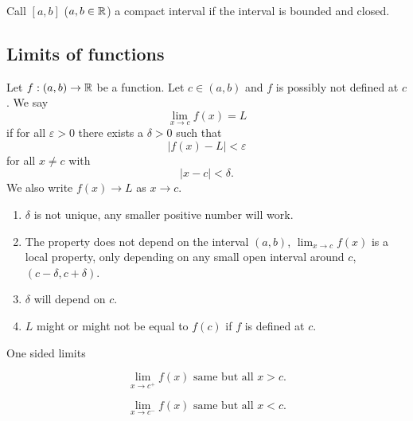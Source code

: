\documentclass[10pt, a4paper]{article}
\begin{document}
\begin{definition}
    Call $[a, b]$
    ($a, b \in \mathbb{R}$)
    a compact interval if the interval is bounded and closed.
\end{definition}

\subsection{Limits of functions}

\begin{definition}
    Let $f : (a, b) \to \mathbb{R}$ be a function.
    Let $c \in (a, b)$ and $f$ is possibly not defined at $c$.
    We say
    \[
    \lim_{x \to c}f(x) = L
    \]
    if for all $\varepsilon > 0$ there exists a $\delta > 0$ such that
    \[
    |f(x) - L| < \varepsilon
    \]
    for all $x \neq c$ with
    \[
    |x - c| < \delta.
    \]
    We also write $f(x) \to L$ as $x \to c$.
\end{definition}

\begin{remark}
    \begin{enumerate}[label = (\roman*)]
        \item $\delta$ is not unique,
        any smaller positive number will work.

        \item The property does not depend on the interval $(a, b)$,
        $\lim_{x \to c}f(x)$ is a local property,
        only depending on any small open interval around $c$,
        $(c - \delta, c + \delta)$.

        \item $\delta$ will depend on $c$.

        \item $L$ might or might not be equal to $f(c)$ if $f$ is defined at $c$.
    \end{enumerate}
\end{remark}

One sided limits

\begin{definition}
    \[
    \lim_{x \to c ^ {+}}f(x) \text{ same but all } x > c.
    \]
\end{definition}


\begin{definition}
    \[
    \lim_{x \to c ^ {-}}f(x) \text{ same but all } x < c.
    \]
\end{definition}
\end{document}
